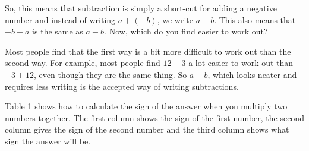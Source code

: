         \label{m38346*id174020}So, this means that subtraction is simply a short-cut for adding a negative
number and instead of writing $a+\left(-b\right)$, we write $a-b$. This also means that
$-b+a$ is the same as $a-b$. Now, which do you find easier to work out?\par 
        \label{m38346*id174090}Most people find that the first way is a bit more difficult to work out than the
second way. For example, most people find $12-3$ a lot easier to work out than
$-3+12$, even though they are the same thing. So $a-b$, which looks neater and
requires less writing is the accepted way of writing subtractions.\par 
        \label{m38346*id174140}Table 1 shows how to calculate the sign of the answer when
you multiply two numbers together. The first column shows the sign of the first
number, the second column gives the sign of the second number and the third
column shows what sign the answer will be.\par 
